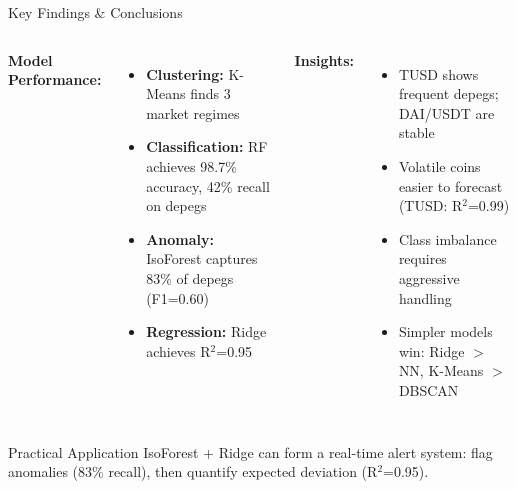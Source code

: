 \documentclass[aspectratio=169]{beamer}
\begin{document}
\begin{frame}{Key Findings \& Conclusions}
\begin{columns}[t]
\textbf{Model Performance:}
\begin{itemize}
    \item \textbf{Clustering:} K-Means finds 3 market regimes
    \item \textbf{Classification:} RF achieves 98.7\% accuracy, 42\% recall on depegs
    \item \textbf{Anomaly:} IsoForest captures 83\% of depegs (F1=0.60)
    \item \textbf{Regression:} Ridge achieves R\(^2\)=0.95
\end{itemize}

\textbf{Insights:}
\begin{itemize}
    \item TUSD shows frequent depegs; DAI/USDT are stable
    \item Volatile coins easier to forecast (TUSD: R\(^2\)=0.99)
    \item Class imbalance requires aggressive handling
    \item Simpler models win: Ridge $>$ NN, K-Means $>$ DBSCAN
\end{itemize}
\end{columns}

\vspace{0.2cm}
\begin{block}{Practical Application}
IsoForest + Ridge can form a real-time alert system: flag anomalies (83\% recall), then quantify expected deviation (R\(^2\)=0.95).
\end{block}
\end{frame}
\end{document}
